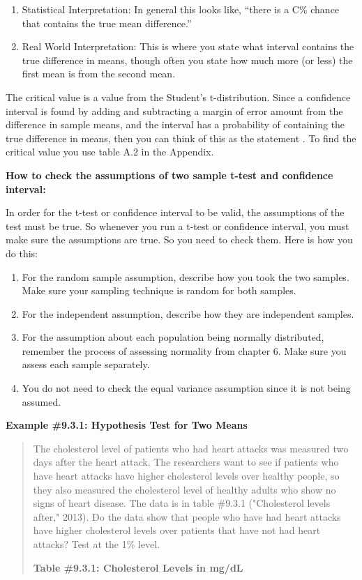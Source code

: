 \documentclass[]{book}
\begin{document}
\begin{enumerate}
\def\labelenumi{\arabic{enumi}.}
\setcounter{enumi}{1}
\item
  Statistical Interpretation: In general this looks like, ``there is a C\% chance that contains the true mean difference.''
\item
  Real World Interpretation: This is where you state what interval contains the true difference in means, though often you state how much more (or less) the first mean is from the second mean.
\end{enumerate}

The critical value is a value from the Student's t-distribution. Since a confidence interval is found by adding and subtracting a margin of error amount from the difference in sample means, and the interval has a probability of containing the true difference in means, then you can think of this as the statement . To find the critical value you use table A.2 in the Appendix.

\textbf{How to check the assumptions of two sample t-test and confidence interval:}

In order for the t-test or confidence interval to be valid, the assumptions of the test must be true. So whenever you run a t-test or confidence interval, you must make sure the assumptions are true. So you need to check them. Here is how you do this:

\begin{enumerate}
\def\labelenumi{\arabic{enumi}.}
\item
  For the random sample assumption, describe how you took the two samples. Make sure your sampling technique is random for both samples.
\item
  For the independent assumption, describe how they are independent samples.
\item
  For the assumption about each population being normally distributed, remember the process of assessing normality from chapter 6. Make sure you assess each sample separately.
\item
  You do not need to check the equal variance assumption since it is not being assumed.
\end{enumerate}

\textbf{Example \#9.3.1: Hypothesis Test for Two Means}

\begin{quote}
The cholesterol level of patients who had heart attacks was measured two days after the heart attack. The researchers want to see if patients who have heart attacks have higher cholesterol levels over healthy people, so they also measured the cholesterol level of healthy adults who show no signs of heart disease. The data is in table \#9.3.1 ("Cholesterol levels after," 2013). Do the data show that people who have had heart attacks have higher cholesterol levels over patients that have not had heart attacks? Test at the 1\% level.

\textbf{Table \#9.3.1: Cholesterol Levels in mg/dL}
\end{quote}
\end{document}
